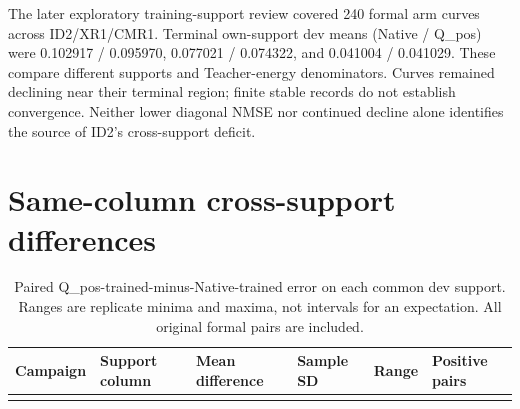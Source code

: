 The later exploratory training-support review covered 240 formal arm curves across ID2/XR1/CMR1. Terminal own-support dev means (Native / Q\_pos) were 0.102917 / 0.095970, 0.077021 / 0.074322, and 0.041004 / 0.041029. These compare different supports and Teacher-energy denominators. Curves remained declining near their terminal region; finite stable records do not establish convergence. Neither lower diagonal NMSE nor continued decline alone identifies the source of ID2's cross-support deficit.

\section{Same-column cross-support differences}\label{same-column-cross-support-differences}

\begin{longtable}[]{@{}
  >{\raggedright\arraybackslash}p{}
  >{\raggedright\arraybackslash}p{}
  >{\raggedleft\arraybackslash}p{}
  >{\raggedleft\arraybackslash}p{}
  >{\raggedright\arraybackslash}p{}
  >{\raggedleft\arraybackslash}p{}@{}}
\caption{Paired Q\_pos-trained-minus-Native-trained error on each common dev support. Ranges are replicate minima and maxima, not intervals for an expectation. All original formal pairs are included.}\label{tbl:C1}\tabularnewline
\toprule\noalign{}
\begin{minipage}[b]{\linewidth}\raggedright
Campaign
\end{minipage} & \begin{minipage}[b]{\linewidth}\raggedright
Support column
\end{minipage} & \begin{minipage}[b]{\linewidth}\raggedleft
Mean difference
\end{minipage} & \begin{minipage}[b]{\linewidth}\raggedleft
Sample SD
\end{minipage} & \begin{minipage}[b]{\linewidth}\raggedright
Range
\end{minipage} & \begin{minipage}[b]{\linewidth}\raggedleft
Positive pairs
\end{minipage} \\
\midrule\noalign{}
\endfirsthead

\end{longtable}
